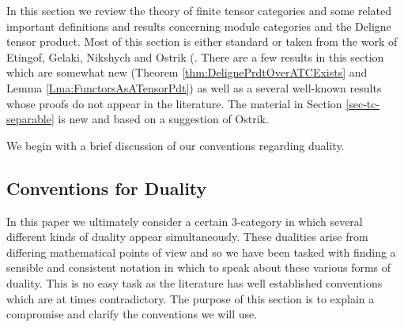 \documentclass{amsart}
\begin{document}
In this section we review the theory of finite tensor categories and some related important definitions and results concerning module categories and the Deligne tensor product.  Most of this section is either standard or taken from the work of Etingof, Gelaki, Nikshych and Ostrik (\cite{MR1976459,MR2183279,MR2097289, 0909.3140, EGNO}.  There are a few results in this section which are somewhat new (Theorem \ref{thm:DelignePrdtOverATCExists} and Lemma \ref{Lma:FunctorsAsATensorPdt}) as well as a several well-known results whose proofs do not appear in the literature. The material in Section \ref{sec-tc-separable} is new and based on a suggestion of Ostrik.

We begin with a brief discussion of our conventions regarding duality.




\subsection{Conventions for Duality}
In this paper we ultimately consider a certain 3-category in which several different kinds of duality appear simultaneously. These dualities arise from differing mathematical points of view and so we have been tasked with finding a sensible and consistent notation in which to speak about these various forms of duality. This is no easy task as the literature has well established conventions which are at times contradictory.  The purpose of this section is to explain a compromise and clarify the conventions we will use.
\end{document}
